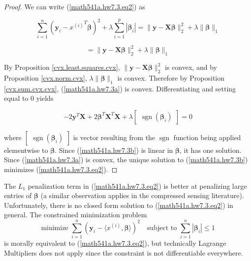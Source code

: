 \begin{proof} 

We can write (\ref{math541a.hw7.3.eq2}) as

\[
\sum_{i=1}^{n}\left(\boldsymbol{y}_{i}-{x^{(i)}}^T\boldsymbol{\beta} \right )^{2}+\lambda \sum_{i=1}^p |\boldsymbol{\beta}_i| = \lVert \boldsymbol{y} - \boldsymbol{X}\boldsymbol{\beta}\rVert_2^2+\lambda \lVert \boldsymbol{\beta}\rVert_1 
\]

\begin{equation}\label{math541a.hw7.3a}
= \lVert \boldsymbol{y} - \boldsymbol{X}\boldsymbol{\beta}\rVert_2^2+ \lambda \lVert \boldsymbol{\beta}\rVert_1 
\end{equation}

By Proposition \ref{cvx.least.squares.cvx}, \( \lVert \boldsymbol{y} - \boldsymbol{X}\boldsymbol{\beta}\rVert_2^2\) is convex, and by Proposition \ref{cvx.norm.cvx}, \(\lambda  \lVert \boldsymbol{\beta}\rVert_1 \) is convex. Therefore by Proposition \ref{cvx.sum.cvx.cvx}, (\ref{math541a.hw7.3a}) is convex. Differentiating and setting equal to 0 yields

\begin{equation}\label{math541a.hw7.3b}
-2\boldsymbol{y}^T\boldsymbol{X} + 2\boldsymbol{\beta}^T \boldsymbol{X}^T\boldsymbol{X} + \lambda \begin{bmatrix} \operatorname{sgn}(\boldsymbol{\beta}_i) \end{bmatrix} = 0
\end{equation}

where \(\begin{bmatrix} \operatorname{sgn}(\boldsymbol{\beta}_i) \end{bmatrix}\) is vector resulting from the \(\operatorname{sgn}\) function being applied elementwise to \(\boldsymbol{\beta}\). Since (\ref{math541a.hw7.3b}) is linear in \(\boldsymbol{\beta}\), it has one solution. Since (\ref{math541a.hw7.3a}) is convex, the unique solution to (\ref{math541a.hw7.3b}) minimizes (\ref{math541a.hw7.3.eq2}).


\end{proof}

\begin{remark}
The $L_{1}$ penalization term in (\ref{math541a.hw7.3.eq2}) is better at penalizing large entries of $\boldsymbol{\beta}$ (a similar observation applies in the compressed sensing literature).  Unfortunately, there is no closed form solution to (\ref{math541a.hw7.3.eq2}) in general.  The constrained minimization problem
$$\mbox{minimize}\,\,\sum_{i=1}^{n}(\boldsymbol{y}_{i}-\langle x^{(i)},\boldsymbol{\beta}\rangle)^{2}\quad \mbox{subject}\,\,\mbox{to}\,\,\sum_{i=1}^{n}|\boldsymbol{\beta}_{i}|\leq 1$$
is morally equivalent to (\ref{math541a.hw7.3.eq2}), but technically Lagrange Multipliers does not apply since the constraint is not differentiable everywhere.

\end{remark}

